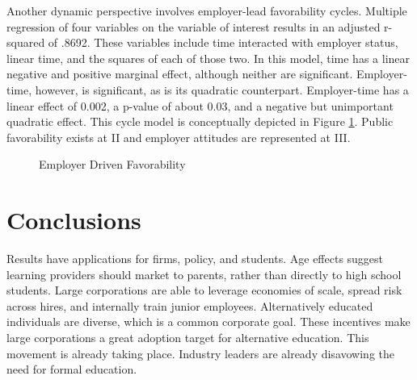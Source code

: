 \documentclass[review]{elsarticle}
\begin{document}
        Another dynamic perspective involves employer-lead favorability cycles.
        Multiple regression of four variables on the variable of interest results in an adjusted r-squared of .8692.
        These variables include time interacted with employer status, linear time, and the squares of each of
        those two.
        In this model, time has a linear negative and positive marginal effect, although neither are significant.
        Employer-time, however, is significant, as is its quadratic counterpart.
        Employer-time has a linear effect of 0.002, a p-value of about 0.03, and a negative but unimportant
        quadratic effect.
        This cycle model is conceptually depicted in Figure \ref{fig:employer_driven_favorability}.
        Public favorability exists at II and employer attitudes are represented at III.
        
        \begin{figure}[h!]
            \centering
            \caption{Employer Driven Favorability}
        

            \label{fig:employer_driven_favorability}
            \end{figure}

        \section{Conclusions}
        
        Results have applications for firms, policy, and students.
        Age effects suggest learning providers should market to parents,
        rather than directly to high school students.
        Large corporations are able to leverage economies of scale, spread risk across hires,
        and internally train junior employees.
        Alternatively educated individuals are diverse\cite{florentine_2018}, which is a common corporate goal.
        These incentives make large corporations a great adoption target for alternative education.
        This movement is already taking place. Industry leaders are already disavowing the need for formal education\cite{glassdoor_2018}.
\end{document}
